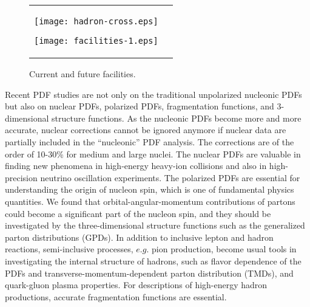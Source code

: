 \documentclass{PoS}
\begin{document}
\begin{figure}[b!]
\vspace{0.10cm}
\begin{minipage}{\textwidth}
\begin{tabular}{lc}
\hspace{-0.40cm}
\begin{minipage}[c]{0.45\textwidth}
   \vspace{-0.0cm}
   \begin{center}
     \texttt{[image: hadron-cross.eps]}
   \end{center}
\vspace{-0.35cm}
\caption{High-energy hadron reactions.}
\label{fig:hard-cross}
\vspace{-0.4cm}
\end{minipage} 
\hspace{-0.0cm}
\begin{minipage}[c]{0.54\textwidth}
    \vspace{-0.5cm}
   \begin{center}
    \texttt{[image: facilities-1.eps]}
   \end{center}
\vspace{-0.80cm}
\caption{Current and future facilities.}
\label{fig:facilities}
\vspace{-0.4cm}   
\end{minipage}
\end{tabular}
\vspace{0.20cm}
\end{minipage}
\end{figure}

Recent PDF studies are not only on the traditional 
unpolarized nucleonic PDFs but also on nuclear PDFs, polarized PDFs,
fragmentation functions, and 3-dimensional structure functions.
As the nucleonic PDFs become more and more accurate, 
nuclear corrections cannot be ignored anymore if nuclear data
are partially included in the ``nucleonic'' PDF analysis.
The corrections are of the order of 10-30\% for medium and large nuclei. 
The nuclear PDFs are valuable in finding new phenomena 
in high-energy heavy-ion collisions and also
in high-precision neutrino oscillation experiments.
The polarized PDFs are essential for understanding the origin of nucleon
spin, which is one of fundamental physics quantities. 
We found that orbital-angular-momentum contributions of partons 
could become a significant part of the nucleon spin, and they should be
investigated by the three-dimensional structure functions such as
the generalized parton distributions (GPDs).
In addition to inclusive lepton and hadron reactions, semi-inclusive
processes, $e.g.$ pion production, become usual tools in 
investigating the internal structure of hadrons, such as 
flavor dependence of the PDFs and transverse-momentum-dependent 
parton distribution (TMDs), and quark-gluon plasma properties.
For descriptions of high-energy hadron productions, accurate
fragmentation functions are essential.
\end{document}

